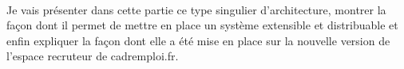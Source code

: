 \paragraph{}
Je vais présenter dans cette partie ce type singulier d'architecture, montrer la façon dont il permet de mettre en place un système extensible et distribuable et enfin expliquer la façon dont elle a été mise en place sur la nouvelle version de l'espace recruteur de cadremploi.fr.



